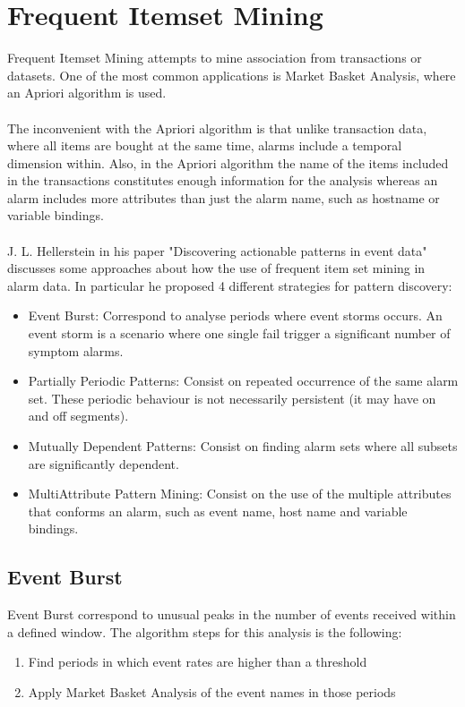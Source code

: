 \documentclass[10pt,a4paper]{article}
\begin{document}
\section{Frequent Itemset Mining}
Frequent Itemset Mining attempts to mine association from transactions or datasets. One of the most common applications is Market Basket Analysis, where an Apriori algorithm is used.
\\\\
The inconvenient with the Apriori algorithm is that unlike transaction data, where all items are bought at the same time, alarms include a temporal dimension within. Also, in the Apriori algorithm the name of the items included in the transactions constitutes enough information for the analysis whereas an alarm includes more attributes than just the alarm name, such as hostname or variable bindings.
\\\\
J. L. Hellerstein in his paper "Discovering actionable patterns in event data" discusses some approaches about how the use of frequent item set mining in alarm data. In particular he proposed 4 different strategies for pattern discovery:
\begin{itemize}
\item Event Burst: Correspond to analyse periods where event storms occurs. An event storm is a scenario where one single fail trigger a significant number of symptom alarms.
\item Partially Periodic Patterns: Consist on repeated occurrence of the same alarm set. These periodic behaviour is not necessarily persistent (it may have on and off segments). 
\item Mutually Dependent Patterns: Consist on finding alarm sets where all subsets are significantly dependent.
\item MultiAttribute Pattern Mining: Consist on the use of the multiple attributes that conforms an alarm, such as event name, host name and variable bindings.
\end{itemize}

\subsection{Event Burst}

Event Burst correspond to unusual peaks in the number of events received within a defined window. The algorithm steps for this analysis is the following:

\begin{enumerate}
\item Find periods in which event rates are higher than a threshold
\item Apply Market Basket Analysis of the event names in those periods
\end{enumerate}
\end{document}
